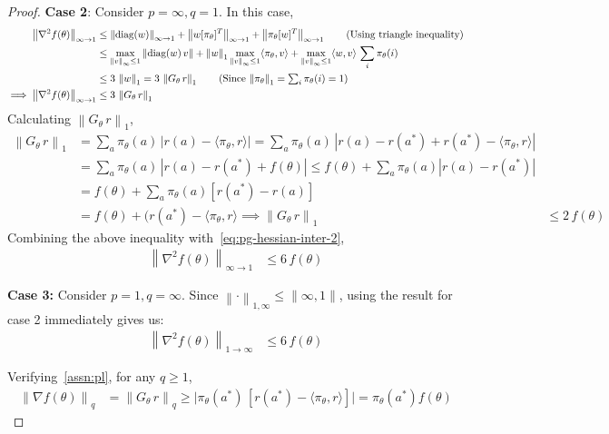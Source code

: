 \documentclass{article}
\newcommand{\norm}[1]{\left\|#1 \right\|}
\begin{document}
\begin{proof}
\textbf{Case 2}: Consider $p = \infty, q = 1$. In this case, 
\begin{align}
\norm{\nabla^2 f(\theta)}_{\infty \to 1} & \leq \norm{\text{diag}(w)}_{\infty \to 1} + \norm{w [\pi_\theta]^T}_{\infty \to 1} +  \norm{\pi_\theta [w]^T}_{\infty \to 1} \tag{Using triangle inequality} \\
& \leq \max_{\norm{v}_\infty \leq 1} \norm{\text{diag}(w) \, v} + \norm{w}_{1} \max_{\norm{v}_\infty \leq 1} \langle \pi_\theta, v \rangle + \max_{\norm{v}_\infty \leq 1} \langle w, v \rangle \, \sum_i \pi_\theta(i) \nonumber \\
& \leq 3 \, \norm{w}_{1} = 3 \, \norm{G_\theta \, r}_{1} \tag{Since $\norm{\pi_{\theta}}_1 = \sum_i \pi_\theta(i) = 1$} \\
\implies \norm{\nabla^2 f(\theta)}_{\infty \to 1} & \leq 3 \, \norm{G_\theta \, r}_{1} \label{eq:pg-hessian-inter-2}
\end{align}
Calculating $\norm{G_\theta \, r}_{1}$,
\begin{align*}
\norm{G_\theta \, r}_{1} &= \sum_{a} \pi_\theta(a) \, |r(a) - \langle \pi_\theta, r \rangle | = \sum_{a} \pi_\theta(a) \, |r(a) - r(a^*) + r(a^*) - \langle \pi_\theta, r \rangle | \\
& = \sum_{a} \pi_\theta(a) \, |r(a) - r(a^*) + f(\theta)| \leq f(\theta) + \sum_{a} \pi_\theta(a) |r(a) - r(a^*)| \tag{Using triangle inequality and definition of $f(\theta)$} \\
& = f(\theta) + \sum_{a} \pi_\theta(a) [r(a^*) - r(a)] \tag{Since $r(a^*) > r(a)$ by definition of the optimal arm $a^*$} \\
& = f(\theta) + (r(a^*) - \langle \pi_\theta, r \rangle 
\implies \norm{G_\theta \, r}_{1} &\leq 2 \, f(\theta) 
\end{align*}
Combining the above inequality with~\cref{eq:pg-hessian-inter-2},
\begin{align*}
\norm{\nabla^2 f(\theta)}_{\infty \to 1} & \leq 6 \, f(\theta)  
\end{align*}

\textbf{Case 3:} Consider $p = 1, q = \infty$. Since $\norm{\cdot}_{1,\infty} \leq \norm{\infty,1}$, using the result for case 2 immediately gives us:
\begin{align*}
\norm{\nabla^2 f(\theta)}_{1 \to \infty} & \leq 6 \, f(\theta)      
\end{align*}

Verifying~\cref{assn:pl}, for any $q \geq 1$,
\begin{align*}
\norm{\nabla f(\theta)}_q &= \norm{G_\theta \, r}_q \geq \vert \pi_\theta(a^*) \, [r(a^*) - \langle \pi_\theta, r \rangle] \vert = \pi_\theta(a^*) f(\theta)
\end{align*}
\end{proof}
\end{document}
